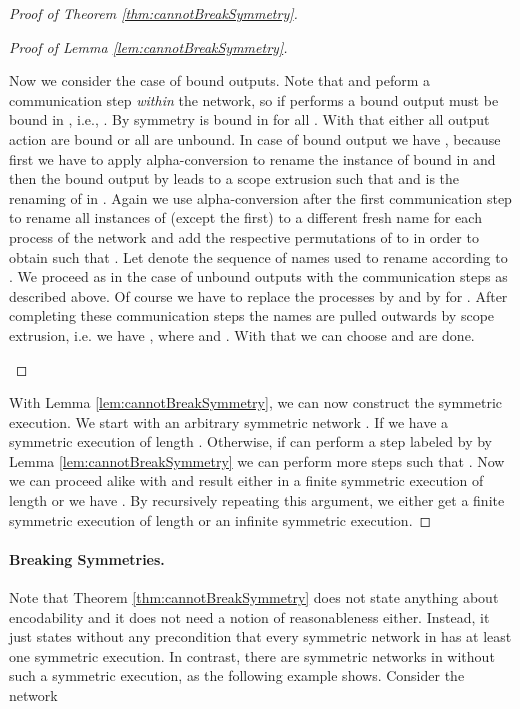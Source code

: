\documentclass[11pt,techReport]{eptcs}
\begin{document}
\begin{proof}[Proof of Theorem \ref{thm:cannotBreakSymmetry}]
\begin{proof}[Proof of Lemma \ref{lem:cannotBreakSymmetry}]
\begin{description}
			
			Now we consider the case of bound outputs. Note that  and  peform a communication step \emph{within} the network, so if  performs a bound output  must be bound in , i.e., . By symmetry  is bound in  for all . With that either all output action are bound or all are unbound. In case of bound output we have , because first we have to apply alpha-conversion to rename the instance of  bound in  and then the bound output by  leads to a scope extrusion such that  and  is the renaming of  in . Again we  use alpha-conversion after the first communication step to rename all instances of  (except the first) to a different fresh name for each process of the network and add the respective permutations of  to  in order to obtain  such that . Let  denote the sequence of names used to rename  according to . We proceed as in the case of unbound outputs with the  communication steps as described above. Of course we have to replace the processes  by  and  by  for . After completing these  communication steps the names  are pulled outwards by scope extrusion, i.e. we have , where  and . With that we can choose  and are done.
	\end{description}
\end{proof}

	With Lemma \ref{lem:cannotBreakSymmetry}, we can now construct the symmetric execution. We start with an arbitrary symmetric network . If  we have a symmetric execution of length . Otherwise, if  can perform a step labeled by  by Lemma \ref{lem:cannotBreakSymmetry} we can perform  more steps such that . Now we can proceed alike with  and result either in a finite symmetric execution of length  or we have . By recursively repeating this argument, we either get a finite symmetric execution of length  or an infinite symmetric execution.
\end{proof}



\paragraph{Breaking Symmetries.}
\label{sec:breaking-symmetries}



Note that Theorem \ref{thm:cannotBreakSymmetry} does not state anything about encodability and it does not need a notion of reasonableness either. Instead, it just states without any precondition that every symmetric network in \procsep has at least one symmetric execution.  In contrast, there are symmetric networks in  without such a symmetric execution, as the following example shows. Consider the network
\end{document}
